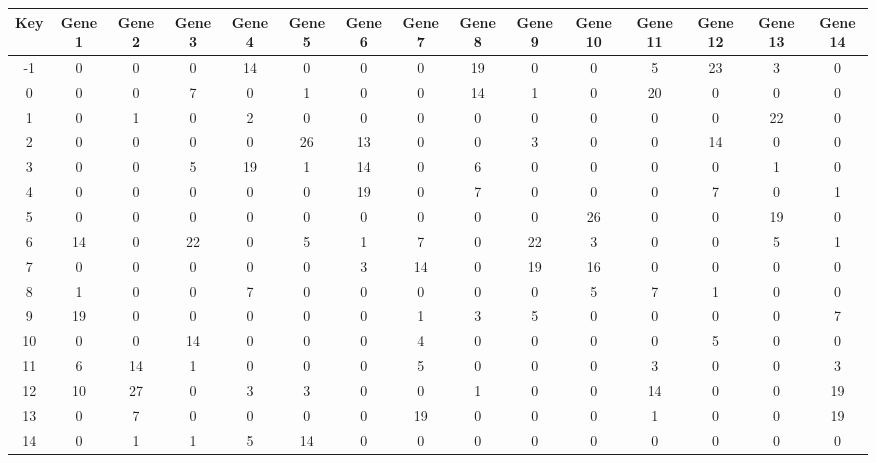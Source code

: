 \begin{tabular}{|c|c|c|c|c|c|c|c|c|c|c|c|c|c|c|}
\hline
Key & Gene 1 & Gene 2 & Gene 3 & Gene 4 & Gene 5 & Gene 6 & Gene 7 & Gene 8 & Gene 9 & Gene 10 & Gene 11 & Gene 12 & Gene 13 & Gene 14 \\
\hline
-1 & 0 & 0 & 0 & 14 & 0 & 0 & 0 & 19 & 0 & 0 & 5 & 23 & 3 & 0 \\
0 & 0 & 0 & 7 & 0 & 1 & 0 & 0 & 14 & 1 & 0 & 20 & 0 & 0 & 0 \\
1 & 0 & 1 & 0 & 2 & 0 & 0 & 0 & 0 & 0 & 0 & 0 & 0 & 22 & 0 \\
2 & 0 & 0 & 0 & 0 & 26 & 13 & 0 & 0 & 3 & 0 & 0 & 14 & 0 & 0 \\
3 & 0 & 0 & 5 & 19 & 1 & 14 & 0 & 6 & 0 & 0 & 0 & 0 & 1 & 0 \\
4 & 0 & 0 & 0 & 0 & 0 & 19 & 0 & 7 & 0 & 0 & 0 & 7 & 0 & 1 \\
5 & 0 & 0 & 0 & 0 & 0 & 0 & 0 & 0 & 0 & 26 & 0 & 0 & 19 & 0 \\
6 & 14 & 0 & 22 & 0 & 5 & 1 & 7 & 0 & 22 & 3 & 0 & 0 & 5 & 1 \\
7 & 0 & 0 & 0 & 0 & 0 & 3 & 14 & 0 & 19 & 16 & 0 & 0 & 0 & 0 \\
8 & 1 & 0 & 0 & 7 & 0 & 0 & 0 & 0 & 0 & 5 & 7 & 1 & 0 & 0 \\
9 & 19 & 0 & 0 & 0 & 0 & 0 & 1 & 3 & 5 & 0 & 0 & 0 & 0 & 7 \\
10 & 0 & 0 & 14 & 0 & 0 & 0 & 4 & 0 & 0 & 0 & 0 & 5 & 0 & 0 \\
11 & 6 & 14 & 1 & 0 & 0 & 0 & 5 & 0 & 0 & 0 & 3 & 0 & 0 & 3 \\
12 & 10 & 27 & 0 & 3 & 3 & 0 & 0 & 1 & 0 & 0 & 14 & 0 & 0 & 19 \\
13 & 0 & 7 & 0 & 0 & 0 & 0 & 19 & 0 & 0 & 0 & 1 & 0 & 0 & 19 \\
14 & 0 & 1 & 1 & 5 & 14 & 0 & 0 & 0 & 0 & 0 & 0 & 0 & 0 & 0 \\
\hline
\end{tabular}